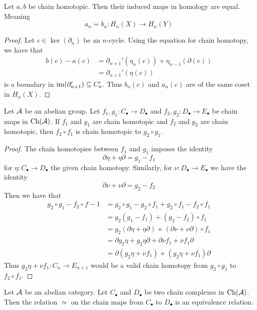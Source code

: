 \documentclass[a4paper]{article}
\begin{document}
\begin{lmm}{}{} Let $a,b$ be chain homotopic. Then their induced maps in homology are equal. Meaning $$a_n=b_n:H_n(X)\to H_n(Y)$$ \tcbline
\begin{proof}
Let $c\in\ker(\partial_n)$ be an $n$-cycle. Using the equation for chain homotopy, we have that 
\begin{align*}
b(c)-a(c)&=\partial_{n+1}'(\eta_n(c))+\eta_{n-1}(\partial(c))\\
&=\partial_{n+1}'(\eta(c))
\end{align*}
 is a boundary in $\operatorname{im}(\partial_{n+1}')\subseteq C_n'$. Thus $b_n(c)$ and $a_n(c)$ are of the same coset in $H_n(X)$. 
\end{proof}
\end{lmm}

\begin{prp}{}{} Let $\mathcal{A}$ be an abelian group. Let $f_1,g_1:C_\bullet\to D_\bullet$ and $f_2,g_2:D_\bullet\to E_\bullet$ be chain maps in $\text{Ch}(\mathcal{A})$. If $f_1$ and $g_1$ are chain homotopic and $f_2$ and $g_2$ are chain homotopic, then $f_2\circ f_1$ is chain homotopic to $g_2\circ g_1$. \tcbline
\begin{proof}
The chain homotopies between $f_1$ and $g_1$ imposes the identity $$\partial\eta+\eta\partial=g_1-f_1$$ for $\eta:C_\bullet\to D_\bullet$ the given chain homotopy. Similarly, for $\nu:D_\bullet\to E_\bullet$ we have the identity $$\partial\nu+\nu\partial=g_2-f_2$$ Then we have that 
\begin{align*}
g_2\circ g_1-f_2\circ f-1&=g_2\circ g_1-g_2\circ f_1+g_2\circ f_1-f_2\circ f_1\\
&=g_2(g_1-f_1)+(g_2-f_2)\circ f_1\\
&=g_2(\partial\eta+\eta\partial)+(\partial\nu+\nu\partial)\circ f_1\\
&=\partial g_2\eta+g_2\eta\partial+\partial\nu f_1+\nu f_1\partial\\
&=\partial(g_2\eta+\nu f_1)+(g_2\eta+\nu f_1)\partial
\end{align*}
Thus $g_2\eta+\nu f_1:C_n\to E_{n+1}$ would be a valid chain homotopy from $g_2\circ g_1$ to $f_2\circ f_1$. 
\end{proof}
\end{prp}

\begin{lmm}{}{} Let $\mathcal{A}$ be an abelian category. Let $C_\bullet$ and $D_\bullet$ be two chain complexes in $\text{Ch}(\mathcal{A})$. Then the relation $\simeq$ on the chain maps from $C_\bullet$ to $D_\bullet$ is an equivalence relation. 
\end{lmm}
\end{document}
